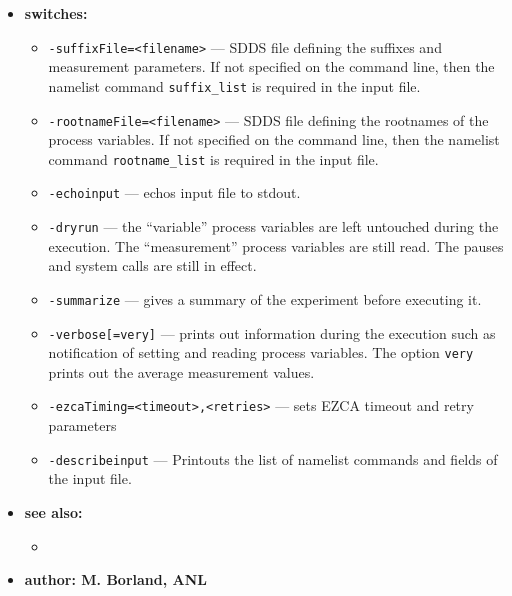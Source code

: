 \begin{itemize}
\item {\bf switches:}
%
%
   \begin{itemize}
   \item {\verb+-suffixFile=<filename>+} --- SDDS file defining the suffixes and measurement parameters. If not specified
                on the command line, then the namelist command {\verb+suffix_list+} is required in the input file.
   \item {\verb+-rootnameFile=<filename>+} --- SDDS file defining the rootnames of the process variables. If not specified
                on the command line, then the namelist command {\verb+rootname_list+} is required in the input file.
    \item {\verb+-echoinput+} --- echos input file to stdout.
    \item {\verb+-dryrun+} --- the ``variable'' process variables are left untouched during the execution. The ``measurement''
                process variables are still read. The pauses and system calls are still in effect.
    \item {\verb+-summarize+} --- gives a summary of the experiment before executing it.
    \item {\verb+-verbose[=very]+} --- prints out information during the execution such as notification of 
                setting and reading process variables.  The option \verb+very+ prints out the average measurement values.
    \item {\verb+-ezcaTiming=<timeout>,<retries>+} --- sets EZCA timeout and retry parameters
    \item {\verb+-describeinput+} --- Printouts the list of namelist commands and fields of the input file.
    \end{itemize}

\item {\bf see also:}
    \begin{itemize}
%
%
    \item {}
    \end{itemize}
%
%
\item {\bf author: M. Borland, ANL} 
\end{itemize}
